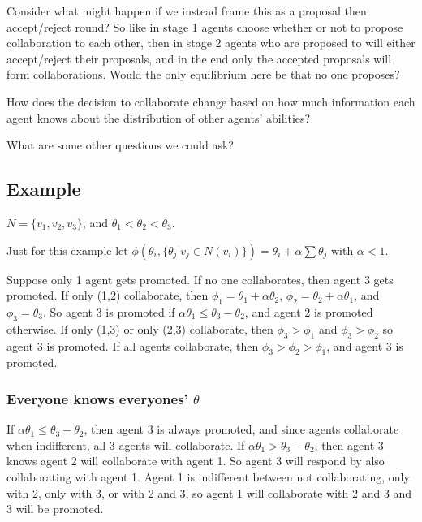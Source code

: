 \documentclass[11pt]{article}
\theoremstyle{quest}
\begin{document}
Consider what might happen if we instead frame this as a proposal then accept/reject round? So like in stage 1 agents choose whether or not to propose collaboration to each other, then in stage 2 agents who are proposed to will either accept/reject their proposals, and in the end only the accepted proposals will form collaborations. Would the only equilibrium here be that no one proposes?

How does the decision to collaborate change based on how much information each agent knows about the distribution of other agents' abilities? 

What are some other questions we could ask?

\subsection{Example}
$N = \{v_1, v_2, v_3\}$, and $\theta_1<\theta_2<\theta_3$. 

Just for this example let $\phi(\theta_i, \{\theta_j|v_j\in N(v_i)\}) = \theta_i + \alpha\sum\theta_j$ with $\alpha < 1$. 

Suppose only 1 agent gets promoted. 
If no one collaborates, then agent 3 gets promoted. 
If only (1,2) collaborate, then $\phi_1 = \theta_1 +\alpha\theta_2$, $\phi_2 = \theta_2+\alpha\theta_1$, and $\phi_3 = \theta_3$. So agent 3 is promoted if $\alpha\theta_1\leq \theta_3-\theta_2$, and agent 2 is promoted otherwise.
If only (1,3) or only (2,3) collaborate, then $\phi_3 > \phi_1$ and $\phi_3 > \phi_2$ so agent 3 is promoted. 
If all agents collaborate, then $\phi_3 > \phi_2 > \phi_1$, and agent 3 is promoted.


\subsubsection{Everyone knows everyones' $\theta$}
If $\alpha\theta_1\leq \theta_3-\theta_2$, then agent 3 is always promoted, and since agents collaborate when indifferent, all 3 agents will collaborate. 
If $\alpha\theta_1>\theta_3-\theta_2$, then agent 3 knows agent 2 will collaborate with agent 1. So agent 3 will respond by also collaborating with agent 1. Agent 1 is indifferent between not collaborating, only with 2, only with 3, or with 2 and 3, so agent 1 will collaborate with 2 and 3 and 3 will be promoted. 

\end{document}
